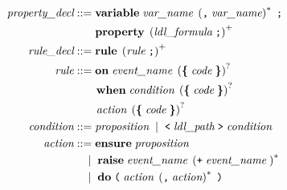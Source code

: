 \documentclass[preview=true]{standalone}
\begin{document}
\begin{table}[t]
\begin{align*}
  \textit{property\_decl} &::=
  \textbf{variable}\;
    \textit{var\_name}\;
    \left(\texttt{,}\; \textit{var\_name}\right)^\ast\; \texttt{;}
  \\&\hspace{1.9em}
  \textbf{property}\;
  \left(\textit{ldl\_formula}\; \texttt{;}\right)^+
  \\
  \textit{rule\_decl} &::= \textbf{rule}\;
  \left(\textit{rule}\; \texttt{;}\right)^+
  \\
  \textit{rule} &::=
  \textbf{on}\; \textit{event\_name}\;
  \left( \textbf{\{}\; \textit{code}\; \textbf{\}} \right)^?
  \\&\qquad
  \textbf{when}\; \textit{condition}\;
  \left( \textbf{\{}\; \textit{code}\; \textbf{\}} \right)^?
  \\&\qquad
  \textit{action}\;
  \left( \textbf{\{}\; \textit{code}\; \textbf{\}} \right)^?\;
  \\
  \textit{condition} &::= \textit{proposition}\;
  \mid\;
  \texttt{<}\; \textit{ldl\_path}\; \texttt{>}\; \textit{condition}
  \\
  \textit{action} &::=
  \textbf{ensure}\; \textit{proposition}
  \\&\quad
  \mid\;
  \textbf{raise}\; \textit{event\_name}\; \left(\texttt{+}\; \textit{event\_name}\; \right)^\ast
  \\&\quad
  \mid\;
  \textbf{do}\;
    \texttt{(}\;
    \textit{action}\; \left(\texttt{,}\; \textit{action}\right)^\ast\;
    \texttt{)}
\end{align*}
\end{table}
\smallskip
\end{document}
